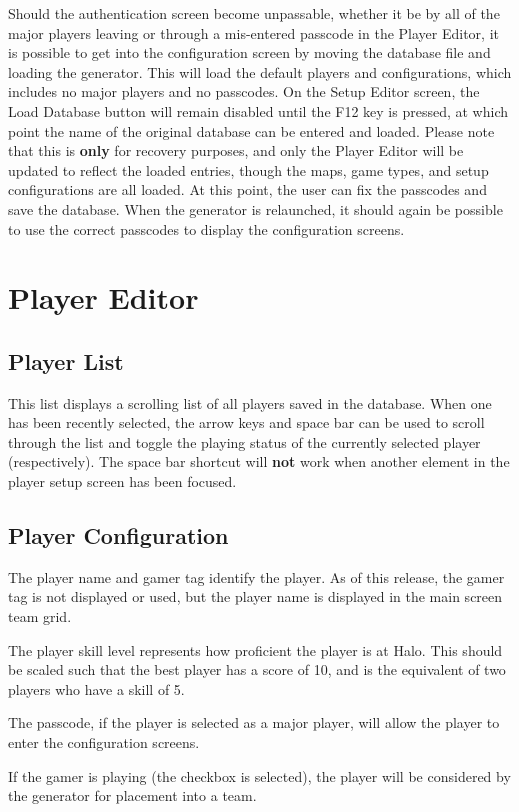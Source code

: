 \documentclass[10pt,a4paper]{report}
\begin{document}
Should the authentication screen become unpassable, whether it be by all of the major players leaving or through a mis-entered passcode in the Player Editor, it is possible to get into the configuration screen by moving the database file and loading the generator.  This will load the default players and configurations, which includes no major players and no passcodes.  On the Setup Editor screen, the Load Database button will remain disabled until the F12 key is pressed, at which point the name of the original database can be entered and loaded.  Please note that this is \textbf{only} for recovery purposes, and only the Player Editor will be updated to reflect the loaded entries, though the maps, game types, and setup configurations are all loaded.  At this point, the user can fix the passcodes and save the database.  When the generator is relaunched, it should again be possible to use the correct passcodes to display the configuration screens.

\section{Player Editor}
\subsection{Player List}
This list displays a scrolling list of all players saved in the database.  When one has been recently selected, the arrow keys and space bar can be used to scroll through the list and toggle the playing status of the currently selected player (respectively).  The space bar shortcut will \textbf{not} work when another element in the player setup screen has been focused.

\subsection{Player Configuration}
The player name and gamer tag identify the player.  As of this release, the gamer tag is not displayed or used, but the player name is displayed in the main screen team grid.

The player skill level represents how proficient the player is at Halo.  This should be scaled such that the best player has a score of 10, and is the equivalent of two players who have a skill of 5.

The passcode, if the player is selected as a major player, will allow the player to enter the configuration screens.

If the gamer is playing (the checkbox is selected), the player will be considered by the generator for placement into a team.
\end{document}
